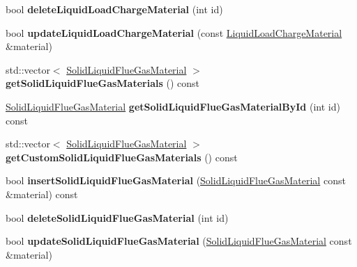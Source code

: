 \begin{DoxyCompactItemize}
\item 
\mbox{\label{class_s_q_lite_a2a3451cb60446d9a90da4cb08920dcfe}} 
bool {\bfseries delete\+Liquid\+Load\+Charge\+Material} (int id)
\item 
\mbox{\label{class_s_q_lite_a89805e7aeb9d72f5dfa6928aac681eab}} 
bool {\bfseries update\+Liquid\+Load\+Charge\+Material} (const \hyperlink{class_liquid_load_charge_material}{Liquid\+Load\+Charge\+Material} \&material)
\item 
\mbox{\label{class_s_q_lite_aeee9b2bce2f489464d7284224a7422c2}} 
std\+::vector$<$ \hyperlink{class_solid_liquid_flue_gas_material}{Solid\+Liquid\+Flue\+Gas\+Material} $>$ {\bfseries get\+Solid\+Liquid\+Flue\+Gas\+Materials} () const
\item 
\mbox{\label{class_s_q_lite_aa7ea5aa679227d695fe38848236281ee}} 
\hyperlink{class_solid_liquid_flue_gas_material}{Solid\+Liquid\+Flue\+Gas\+Material} {\bfseries get\+Solid\+Liquid\+Flue\+Gas\+Material\+By\+Id} (int id) const
\item 
\mbox{\label{class_s_q_lite_a6d11d35cd1cca7b271c64131c30dd829}} 
std\+::vector$<$ \hyperlink{class_solid_liquid_flue_gas_material}{Solid\+Liquid\+Flue\+Gas\+Material} $>$ {\bfseries get\+Custom\+Solid\+Liquid\+Flue\+Gas\+Materials} () const
\item 
\mbox{\label{class_s_q_lite_aa1de7450c37a07dfd0541fdf0dc164ef}} 
bool {\bfseries insert\+Solid\+Liquid\+Flue\+Gas\+Material} (\hyperlink{class_solid_liquid_flue_gas_material}{Solid\+Liquid\+Flue\+Gas\+Material} const \&material) const
\item 
\mbox{\label{class_s_q_lite_ac83353062d75af65c5b01d55570d0ead}} 
bool {\bfseries delete\+Solid\+Liquid\+Flue\+Gas\+Material} (int id)
\item 
\mbox{\label{class_s_q_lite_aed13c3aeeef3fdf7f3b2d72b61dd93e8}} 
bool {\bfseries update\+Solid\+Liquid\+Flue\+Gas\+Material} (\hyperlink{class_solid_liquid_flue_gas_material}{Solid\+Liquid\+Flue\+Gas\+Material} const \&material)
\item 
\mbox{\label{class_s_q_lite_af29fd9f5c71efd6fb1d12a9403e1f433}} 

\end{DoxyCompactItemize}
